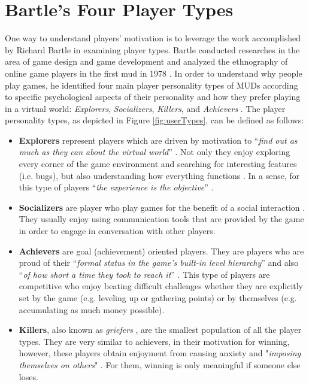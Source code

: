 \section{Bartle's Four Player Types}
One way to understand players' motivation is to leverage the work accomplished by Richard Bartle in examining player types. Bartle conducted researches in the area of game design and game development and analyzed the ethnography of online game players in the first \acrfull{mud} in 1978 \cite{mud}. In order to understand why people play games, he identified four main player personality types of MUDs according to specific psychological aspects of their personality and how they prefer playing in a virtual world: \textit{Explorers}, \textit{Socializers}, \textit{Killers}, and \textit{Achievers} \cite{bartle1996hearts}. The player personality types, as depicted in Figure \ref{fig:userTypes}, can be defined as follows:
\begin{itemize}
\item \textbf{Explorers} represent players which are driven by motivation to ``\textit{find out as much as they can about the 
virtual  world}'' \cite{bartle1996hearts}. Not only they enjoy exploring every corner of the game environment and searching for interesting features (i.e. bugs), but also understanding  how 
everything functions \cite{bartle1996hearts}. 
In a sense, for this type of players ``\textit{the experience is the objective}'' \cite{zichermann2011gamification}.
\item \textbf{Socializers} are player who play games for the benefit of a social interaction \cite{zichermann2011gamification}. They usually enjoy using communication tools that are provided by the game in order to engage in conversation with other players. 
\item \textbf{Achievers} are goal (achievement) oriented players. They are players who are proud of their ``\textit{formal status in the game's built-in level hierarchy}'' and also ``\textit{of how short a time they took to reach it}'' \cite{bartle1996hearts}. This type of players are competitive who enjoy beating difficult challenges whether they are explicitly  set by the game (e.g.  leveling  up  or  gathering  points) or by themselves (e.g. accumulating as much money possible). 
\item \textbf{Killers}, also known as \textit{griefers} \cite{zichermann2011gamification}, are the smallest population of all the player types. They are very similar to achievers, in their motivation for winning, however, these players obtain  enjoyment from causing anxiety and "\textit{imposing  themselves  on  others}" \cite{bartle1996hearts}. For them, winning is only meaningful if someone else loses.
\end{itemize}

